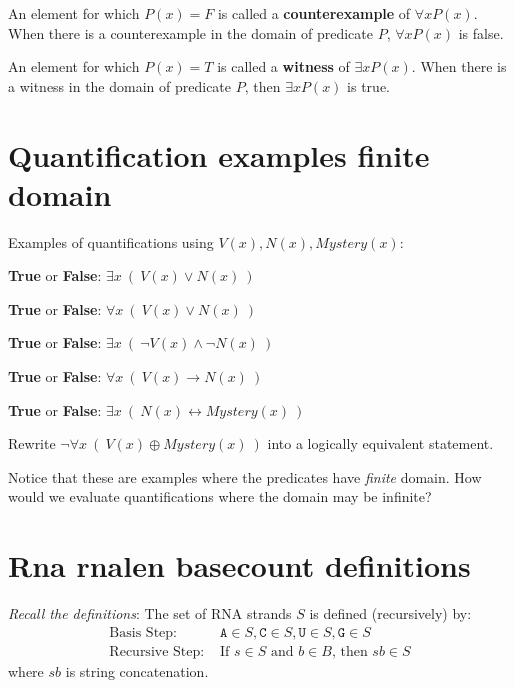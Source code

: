 \documentclass[12pt, oneside]{article}
\newcommand{\A}[0]{\texttt{A}}
\newcommand{\C}[0]{\texttt{C}}
\newcommand{\G}[0]{\texttt{G}}
\newcommand{\U}[0]{\texttt{U}}
\begin{document}
An element for which $P(x) = F$ is called a {\bf counterexample} of $\forall x P(x)$. When there is a counterexample in the domain of predicate $P$,  $\forall x P(x)$ is false.


An element for which $P(x) = T$ is called a {\bf witness} of $\exists x P(x)$. When there is a witness in the domain of predicate $P$, then $\exists x P(x)$ is true.
 \vfill
\section*{Quantification examples finite domain}


Examples of quantifications using $V(x), N(x), Mystery(x)$:



{\bf True} or {\bf False}: $\exists x~ (~V(x) \lor N(x)~)$

\vfill


{\bf True} or {\bf False}: $\forall x~ (~V(x) \lor N(x)~)$

\vfill


{\bf True} or {\bf False}: $\exists x~ (~\lnot V(x) \land \lnot N(x)~)$

\vfill

{\bf True} or {\bf False}: $\forall x~ (~V(x) \to N(x)~)$

\vfill

{\bf True} or {\bf False}: $\exists x~ (~N(x) \leftrightarrow Mystery(x)~)$

\vfill

Rewrite $\lnot \forall x~(~V(x) \oplus Mystery(x)~)$ into a logically equivalent statement.

\vspace{50pt}


Notice that these are examples where the predicates have {\it finite} domain.
How would we evaluate quantifications where the domain may be infinite?

\vfill

 \vfill
\section*{Rna rnalen basecount definitions}


{\it Recall the definitions}: The set of RNA strands $S$ is defined (recursively) by:
\[
\begin{array}{ll}
\textrm{Basis Step: } & \A \in S, \C \in S, \U \in S, \G \in S \\
\textrm{Recursive Step: } & \textrm{If } s \in S\textrm{ and }b \in B \textrm{, then }sb \in S
\end{array}
\]
where $sb$ is string concatenation.
\end{document}
